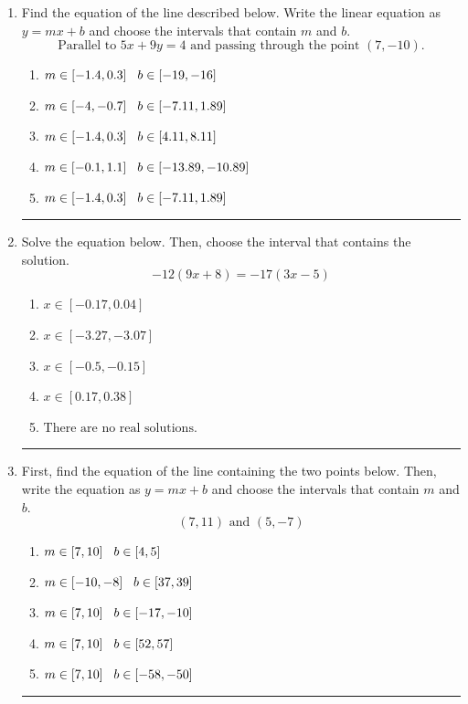 \documentclass[14pt]{extbook}
\newcommand{\litem}[1]{\item#1\hspace*{-1cm}\rule{\textwidth}{0.4pt}}
\begin{document}
\begin{enumerate}
{\begin{enumerate}[label=\Alph*.]
\end{enumerate} }
\litem{
Find the equation of the line described below. Write the linear equation as $ y=mx+b $ and choose the intervals that contain $m$ and $b$.\[ \text{Parallel to } 5 x + 9 y = 4 \text{ and passing through the point } (7, -10). \]\begin{enumerate}[label=\Alph*.]
\item \( m \in [-1.4, 0.3] \hspace*{3mm} b \in [-19, -16] \)
\item \( m \in [-4, -0.7] \hspace*{3mm} b \in [-7.11, 1.89] \)
\item \( m \in [-1.4, 0.3] \hspace*{3mm} b \in [4.11, 8.11] \)
\item \( m \in [-0.1, 1.1] \hspace*{3mm} b \in [-13.89, -10.89] \)
\item \( m \in [-1.4, 0.3] \hspace*{3mm} b \in [-7.11, 1.89] \)

\end{enumerate} }
\litem{
Solve the equation below. Then, choose the interval that contains the solution.\[ -12(9x + 8) = -17(3x -5) \]\begin{enumerate}[label=\Alph*.]
\item \( x \in [-0.17, 0.04] \)
\item \( x \in [-3.27, -3.07] \)
\item \( x \in [-0.5, -0.15] \)
\item \( x \in [0.17, 0.38] \)
\item \( \text{There are no real solutions.} \)

\end{enumerate} }
\litem{
First, find the equation of the line containing the two points below. Then, write the equation as $ y=mx+b $ and choose the intervals that contain $m$ and $b$.\[ (7, 11) \text{ and } (5, -7) \]\begin{enumerate}[label=\Alph*.]
\item \( m \in [7, 10] \hspace*{3mm} b \in [4, 5] \)
\item \( m \in [-10, -8] \hspace*{3mm} b \in [37, 39] \)
\item \( m \in [7, 10] \hspace*{3mm} b \in [-17, -10] \)
\item \( m \in [7, 10] \hspace*{3mm} b \in [52, 57] \)
\item \( m \in [7, 10] \hspace*{3mm} b \in [-58, -50] \)


\end{enumerate}}
\end{enumerate}
\end{document}
